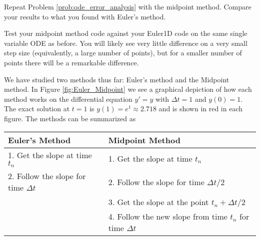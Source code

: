 \begin{problem}
    Repeat Problem \ref{prob:ode_error_analysis} with the midpoint method.  Compare your
    results to what you found with Euler's method.
\end{problem}

\begin{problem}
    Test your midpoint method code against your Euler1D code on the same single variable
    ODE as before.  You will likely see very little difference on a very small step size
    (equivalently, a large number of points), but for a smaller number of points there
    will be a remarkable difference.  
\end{problem}

We have studied two methods thus far: Euler's method and the Midpoint method.  In Figure
\ref{fig:Euler_Midpoint} we see a graphical depiction of how each method works on the
differential equation $y' = y$ with $\Delta t = 1$ and $y(0) = 1$.  The exact solution
at $t=1$ is $y(1) = e^1 \approx 2.718$ and is shown in red in each figure.  The methods
can be summarized as 
\begin{center}
    \begin{tabular}{|l|l|}
        \hline
        Euler's Method & Midpoint Method \\ \hline \hline
        1. Get the slope at time $t_n$ & 1. Get the slope at time $t_n$ \\ \hline
        2. Follow the slope for time $\Delta t$ & 2. Follow the slope for time $\Delta
        t/2$ \\ \hline
        & 3. Get the slope at the point $t_n  + \Delta t/2$ \\ \hline
        & 4. Follow the new slope from time $t_n$ for time $\Delta t$ \\ \hline
    \end{tabular}
\end{center}

